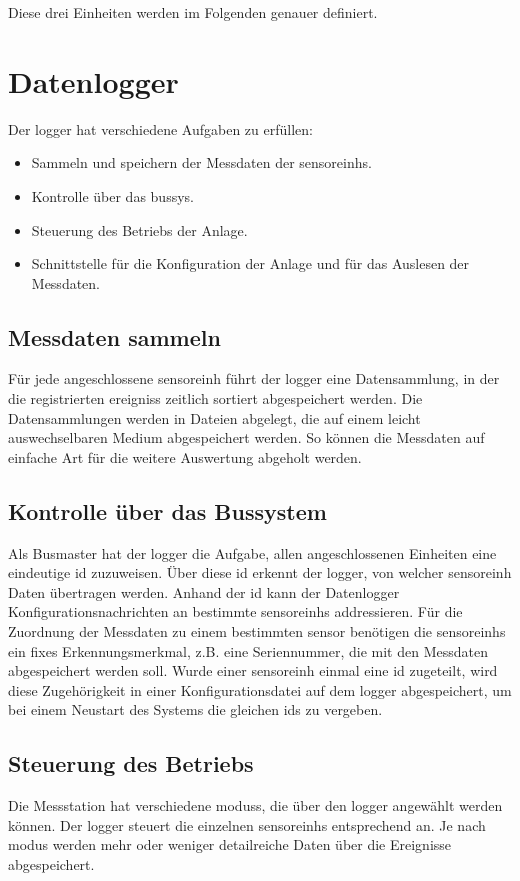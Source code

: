 Diese drei Einheiten werden im Folgenden genauer definiert.

\section{Datenlogger}
Der \gls{logger} hat verschiedene Aufgaben zu erfüllen:
\begin{itemize}
\item Sammeln und speichern der Messdaten der \glspl{sensoreinh}.
\item Kontrolle über das \gls{bussys}.
\item Steuerung des Betriebs der Anlage.
\item Schnittstelle für die Konfiguration der Anlage und für das Auslesen der Messdaten.
\end{itemize}


\subsection{Messdaten sammeln}
Für jede angeschlossene \gls{sensoreinh} führt der \gls{logger} eine Datensammlung, in der die registrierten \glspl{ereignis} zeitlich sortiert abgespeichert werden. Die Datensammlungen werden in Dateien abgelegt, die auf einem leicht auswechselbaren Medium abgespeichert werden. So können die Messdaten auf einfache Art für die weitere Auswertung abgeholt werden.


\subsection{Kontrolle über das Bussystem}
Als Busmaster hat der \gls{logger} die Aufgabe, allen angeschlossenen Einheiten eine eindeutige \gls{id} zuzuweisen. Über diese \gls{id} erkennt der \gls{logger}, von welcher \gls{sensoreinh} Daten übertragen werden. Anhand der \gls{id} kann der Datenlogger Konfigurationsnachrichten an bestimmte \glspl{sensoreinh} addressieren. Für die Zuordnung der Messdaten zu einem bestimmten \gls{sensor} benötigen die \glspl{sensoreinh} ein fixes Erkennungsmerkmal, z.B. eine Seriennummer, die mit den Messdaten abgespeichert werden soll. Wurde einer \gls{sensoreinh} einmal eine \gls{id} zugeteilt, wird diese Zugehörigkeit in einer Konfigurationsdatei auf dem \gls{logger} abgespeichert, um bei einem Neustart des Systems die gleichen \gls{id}s zu vergeben.


\subsection{Steuerung des Betriebs}
Die Messstation hat verschiedene \glspl{modus}, die über den \gls{logger} angewählt werden können. Der \gls{logger} steuert die einzelnen \glspl{sensoreinh} entsprechend an. Je nach \gls{modus} werden mehr oder weniger detailreiche Daten über die Ereignisse abgespeichert.


